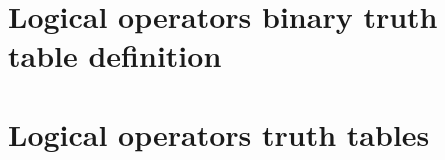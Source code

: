 
\section*{Logical operators binary truth table definition}

\vfill
\section*{Logical operators truth tables}

\vfill
